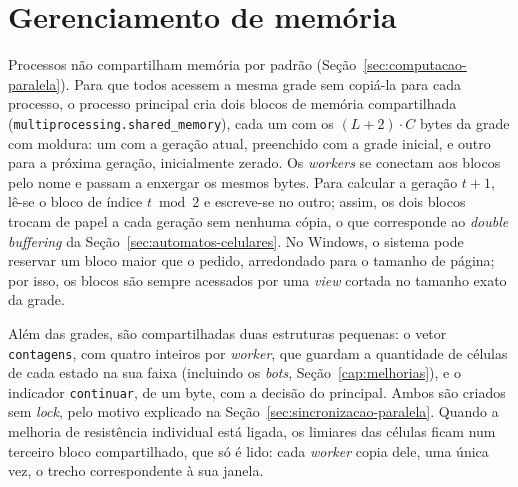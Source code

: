 \section{Gerenciamento de memória}\label{sec:memoria-paralela}

Processos não compartilham memória por padrão (Seção~\ref{sec:computacao-paralela}). Para que todos acessem a mesma grade sem copiá-la para cada processo, o processo principal cria dois blocos de memória compartilhada (\texttt{multiprocessing.shared\_memory}), cada um com os $(L+2) \cdot C$ bytes da grade com moldura: um com a geração atual, preenchido com a grade inicial, e outro para a próxima geração, inicialmente zerado. Os \textit{workers} se conectam aos blocos pelo nome e passam a enxergar os mesmos bytes. Para calcular a geração $t+1$, lê-se o bloco de índice $t \bmod 2$ e escreve-se no outro; assim, os dois blocos trocam de papel a cada geração sem nenhuma cópia, o que corresponde ao \textit{double buffering} da Seção~\ref{sec:automatos-celulares}. No Windows, o sistema pode reservar um bloco maior que o pedido, arredondado para o tamanho de página; por isso, os blocos são sempre acessados por uma \textit{view} cortada no tamanho exato da grade.

Além das grades, são compartilhadas duas estruturas pequenas: o vetor \texttt{contagens}, com quatro inteiros por \textit{worker}, que guardam a quantidade de células de cada estado na sua faixa (incluindo os \textit{bots}, Seção~\ref{cap:melhorias}), e o indicador \texttt{continuar}, de um byte, com a decisão do principal. Ambos são criados sem \textit{lock}, pelo motivo explicado na Seção~\ref{sec:sincronizacao-paralela}. Quando a melhoria de resistência individual está ligada, os limiares das células ficam num terceiro bloco compartilhado, que só é lido: cada \textit{worker} copia dele, uma única vez, o trecho correspondente à sua janela.

